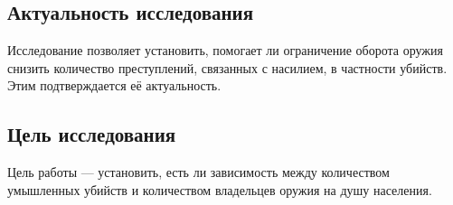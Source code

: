 \documentclass[titlepage]{article}
\begin{document}
\subsection{Актуальность исследования}

Исследование позволяет установить, помогает ли ограничение оборота оружия снизить количество преступлений, связанных с насилием,
в частности убийств. Этим подтверждается её актуальность.

\subsection{Цель исследования}

Цель работы --- установить, есть ли зависимость между количеством умышленных убийств и количеством владельцев оружия на душу населения.

\clearpage
\appendix
\end{document}
